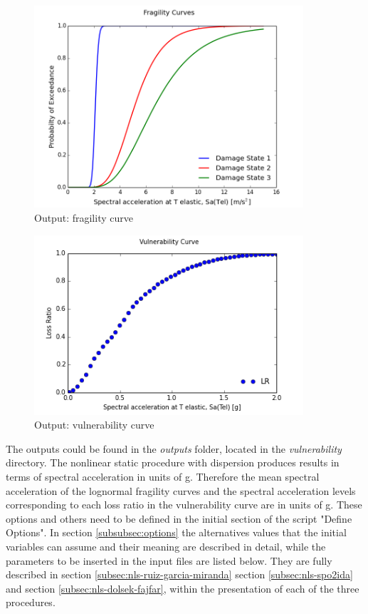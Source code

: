 \begin{figure}[!htbp]
\centering
\includegraphics[width=10cm]{./figures/fragility.png}
\caption{Output: fragility curve}
\label{fig:expFragility}
\end{figure}

\begin{figure}[!htbp]
\centering
\includegraphics[width=10cm]{./figures/vulnerability.png}
\caption{Output: vulnerability curve}
\label{fig:expVulnerability}
\end{figure}

The outputs could be found in the \textit{outputs} folder, located in the \textit{vulnerability} directory. The nonlinear static procedure with dispersion produces results in terms of spectral acceleration in units of g. Therefore the mean spectral acceleration of the lognormal fragility curves and the spectral acceleration levels corresponding to each loss ratio in the vulnerability curve are in units of g.
These options and others need to be defined in the initial section of the script "Define Options". In section \ref{subsubsec:options} the alternatives values that the initial variables can assume and their meaning are described in detail, while the parameters to be inserted in the input files are listed below. They are fully described in section \ref{subsec:nls-ruiz-garcia-miranda} section \ref{subsec:nls-spo2ida} and section  \ref{subsec:nls-dolsek-fajfar}, within the presentation of each of the three procedures.

